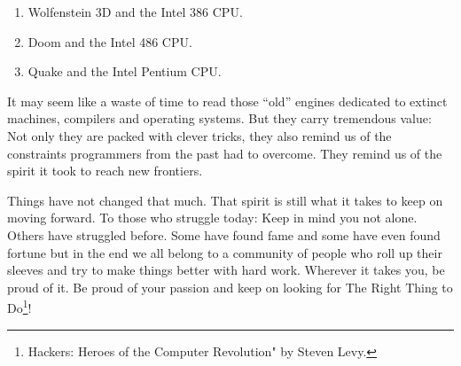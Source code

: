 \documentclass[book.tex]{subfiles}
\begin{document}
\begin{enumerate}
\item Wolfenstein 3D and the Intel 386 CPU.
\item Doom and the Intel 486 CPU.
\item Quake and the Intel Pentium CPU.
\end{enumerate}

\bigskip

It may seem like a waste of time to read those ``old'' engines dedicated to extinct machines, compilers and operating systems. But they carry tremendous value: Not only they are packed with clever tricks, they also remind us of the constraints programmers from the past had to overcome. They remind us of the spirit it took to reach new frontiers.\\
\par
Things have not changed that much. That spirit is still what it takes to keep on moving forward. To those who struggle today: Keep in mind you not alone. Others have struggled before. Some have found fame and some have even found fortune but in the end we all belong to a community of people who roll up their sleeves and try to make things better with hard work. Wherever it takes you, be proud of it. Be proud of your passion and keep on looking for The Right Thing to Do\footnote{Hackers: Heroes of the Computer Revolution" by Steven Levy.}!\\



\end{document}
